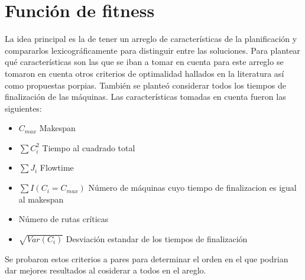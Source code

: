 \section{Función de fitness}
La idea principal es la de tener un arreglo de características de la planificación y compararlos lexicográficamente para distinguir entre las soluciones. Para plantear qué características son las que se iban a tomar en cuenta para este arreglo se tomaron en cuenta otros criterios de optimalidad hallados en la literatura así como propuestas porpias. También se planteó considerar todos los tiempos de finalización de las máquinas. Las características tomadas en cuenta fueron las siguientes:
\begin{itemize}
\item $C_{max}$ Makespan 
\item $\sum C_i^2$ Tiempo al cuadrado total 
\item $\sum J_i$ Flowtime 
\item $\sum I(C_i=C_{max})$ Número de máquinas cuyo tiempo de finalizacion es igual al makespan 
\item Número de rutas críticas 
\item $\sqrt{Var(C_i)}$ Desviación estandar de los tiempos de finalización 
\end{itemize}

Se probaron estos criterios a pares para determinar el orden en el que podrian dar mejores resultados al cosiderar a todos en el areglo.
